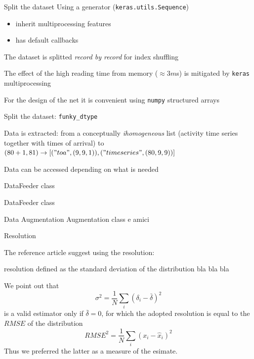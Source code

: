 \documentclass{beamer}
\begin{document}
\begin{frame}{Split the dataset}
    Using a generator (\texttt{keras.utils.Sequence})
    \begin{itemize}
        \item inherit multiprocessing features
        \item has default callbacks
    \end{itemize}
    The dataset is splitted \emph{record by record} for index shuffling

    The effect of the high reading time from memory ($\approx 3 m$s) is mitigated
    by \texttt{keras} multiprocessing
    
    For the design of the net it is convenient using \texttt{numpy} structured arrays
\end{frame}

\begin{frame}{Split the dataset: \texttt{funky\_dtype}}

    Data is extracted: from a conceptually \emph{ihomogeneous} list 
    (activity time series together with times of arrival) to
    $(80 + 1, 81) \rightarrow [("toa", (9, 9, 1)), ("timeseries", (80, 9,9))]$

    Data can be accessed depending on what is needed

\end{frame}


\begin{frame}{DataFeeder class}

    
\end{frame}

\begin{frame}{DataFeeder class}

    
\end{frame}

\begin{frame}{Data Augmentation}
    Augmentation class e amici
    
\end{frame}

\begin{frame}{Resolution}

    The reference article suggest using the resolution:
    \begin{block}{resolution}
        defined as the standard deviation of the distribution bla bla bla
    \end{block}

    We point out that 
    \[\sigma^2 = \frac{1}{N}\sum_i (\delta_i - \bar{\delta})^2\]
    is a valid %
    estimator only if $\bar{\delta} = 0$, for which the adopted resolution is equal 
    to the $RMSE$ of the distribution
    \[ RMSE^2 = \frac{1}{N}\sum_i(x_i - \hat{x}_i)^2 \]
    Thus we preferred the latter as a measure of the esimate.

\end{frame}
\end{document}
